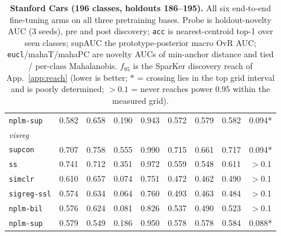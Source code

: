 \documentclass{article}
\begin{document}
\begin{table}[p]
\begin{tabular}{lcccccccc}
\texttt{nplm-sup} & 0.582 & 0.658 & 0.190 & 0.943 & 0.572 & 0.579 & 0.582 & 0.094* \\
\multicolumn{9}{l}{\emph{visreg}}\\
\texttt{supcon} & 0.707 & 0.758 & 0.555 & 0.990 & 0.715 & 0.661 & 0.717 & 0.094* \\
\texttt{ss} & 0.741 & 0.712 & 0.351 & 0.972 & 0.559 & 0.548 & 0.611 & $>$0.1 \\
\texttt{simclr} & 0.610 & 0.657 & 0.074 & 0.751 & 0.472 & 0.462 & 0.490 & $>$0.1 \\
\texttt{sigreg-ssl} & 0.574 & 0.634 & 0.064 & 0.760 & 0.493 & 0.463 & 0.484 & $>$0.1 \\
\texttt{nplm-bil} & 0.576 & 0.624 & 0.081 & 0.826 & 0.537 & 0.490 & 0.523 & $>$0.1 \\
\texttt{nplm-sup} & 0.579 & 0.549 & 0.186 & 0.950 & 0.578 & 0.578 & 0.584 & 0.088* \\
\bottomrule
\end{tabular}
\caption{\textbf{Stanford Cars (196 classes, holdouts 186--195).} All six end-to-end fine-tuning arms on all three
pretraining bases. Probe is holdout-novelty AUC (3 seeds), pre and post
discovery; \texttt{acc} is nearest-centroid top-1 over seen classes; supAUC the
prototype-posterior macro OvR AUC; \texttt{eucl}/mahaT/mahaPC are novelty AUCs
of min-anchor distance and tied / per-class Mahalanobis. $f_{95}$ is the
SparKer discovery reach of App.~\ref{app:reach} (lower is better;
$*$ = crossing lies in the top grid interval and is poorly determined;
$>0.1$ = never reaches power $0.95$ within the measured grid).}
\label{tab:full-cars}
\end{table}
\end{document}
